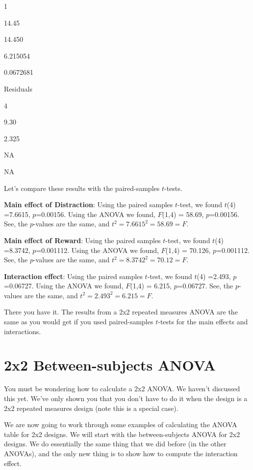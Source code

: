 \documentclass[]{book}
\begin{document}
1

14.45

14.450

6.215054

0.0672681

Residuals

4

9.30

2.325

NA

NA

Let's compare these results with the paired-samples \(t\)-tests.

\textbf{Main effect of Distraction}: Using the paired samples \(t\)-test, we found \(t\)(4) =7.6615, \(p\)=0.00156. Using the ANOVA we found, \(F\)(1,4) = 58.69, \(p\)=0.00156. See, the \(p\)-values are the same, and \(t^2 = 7.6615^2 = 58.69 = F\).

\textbf{Main effect of Reward}: Using the paired samples \(t\)-test, we found \(t\)(4) =8.3742, \(p\)=0.001112. Using the ANOVA we found, \(F\)(1,4) = 70.126, \(p\)=0.001112. See, the \(p\)-values are the same, and \(t^2 = 8.3742^2 = 70.12 = F\).

\textbf{Interaction effect}: Using the paired samples \(t\)-test, we found \(t\)(4) =2.493, \(p\)=0.06727. Using the ANOVA we found, \(F\)(1,4) = 6.215, \(p\)=0.06727. See, the \(p\)-values are the same, and \(t^2 = 2.493^2 = 6.215 = F\).

There you have it. The results from a 2x2 repeated measures ANOVA are the same as you would get if you used paired-samples \(t\)-tests for the main effects and interactions.

\hypertarget{x2-between-subjects-anova}{%
\section{2x2 Between-subjects ANOVA}\label{x2-between-subjects-anova}}

You must be wondering how to calculate a 2x2 ANOVA. We haven't discussed this yet. We've only shown you that you don't have to do it when the design is a 2x2 repeated measures design (note this is a special case).

We are now going to work through some examples of calculating the ANOVA table for 2x2 designs. We will start with the between-subjects ANOVA for 2x2 designs. We do essentially the same thing that we did before (in the other ANOVAs), and the only new thing is to show how to compute the interaction effect.
\end{document}
